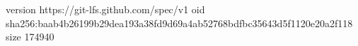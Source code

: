 version https://git-lfs.github.com/spec/v1
oid sha256:baab4b26199b29dea193a38fd9d69a4ab52768bdfbc35643d5f1120e20a2f118
size 174940
